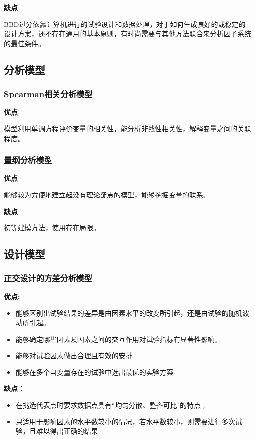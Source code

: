 \documentclass[withoutpreface,bwprint]{cumcmthesis} %
\begin{document}
\textbf{缺点}

BBD过分依靠计算机进行的试验设计和数据处理，对于如何生成良好的或稳定的设计方案，还不存在通用的基本原则，有时尚需要与其他方法联合来分析因子系统的最佳条件。


\subsection{分析模型}
\subsubsection{Spearman相关分析模型}
\textbf{优点}

模型利用单调方程评价变量的相关性，能分析非线性相关性，解释变量之间的关联程度。

\subsubsection{量纲分析模型}
\textbf{优点}

能够较为方便地建立起没有理论疑点的模型，能够挖掘变量的联系。

\textbf{缺点}

初等建模方法，使用存在局限。

\subsection{设计模型}
\subsubsection{正交设计的方差分析模型}
\textbf{优点:}
\begin{itemize}
	\item 能够区别出试验结果的差异是由因素水平的改变所引起，还是由试验的随机波动所引起。
	\item 能够确定哪些因素及因素之间的交互作用对试验指标有显著性影响。
	\item 能够对试验因素做出合理且有效的安排
	\item 能够在多个自变量存在的试验中选出最优的实验方案
\end{itemize}

\textbf{缺点：}
\begin{itemize}
	\item 在挑选代表点时要求数据点具有“均匀分散、整齐可比”的特点；
	\item 只适用于影响因素的水平数较小的情况，若水平数较小，则需要进行多次试验，且难以得出正确的结果
\end{itemize}
\end{document}
